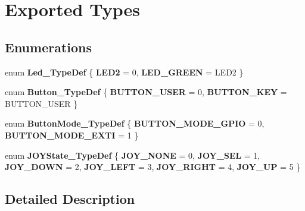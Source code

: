 \hypertarget{group___s_t_m32_f0_x_x___n_u_c_l_e_o___exported___types}{}\section{Exported Types}
\label{group___s_t_m32_f0_x_x___n_u_c_l_e_o___exported___types}
\subsection*{Enumerations}
\begin{DoxyCompactItemize}
\item 
\mbox{\label{group___s_t_m32_f0_x_x___n_u_c_l_e_o___exported___types_gaa059704b7ca945eb9c1e7f2c3d03fecd}} 
enum {\bfseries Led\+\_\+\+Type\+Def} \{ {\bfseries L\+E\+D2} = 0, 
{\bfseries L\+E\+D\+\_\+\+G\+R\+E\+EN} = L\+E\+D2
 \}
\item 
\mbox{\label{group___s_t_m32_f0_x_x___n_u_c_l_e_o___exported___types_ga643816dfbad5c734fc25a29ce8d35bb1}} 
enum {\bfseries Button\+\_\+\+Type\+Def} \{ {\bfseries B\+U\+T\+T\+O\+N\+\_\+\+U\+S\+ER} = 0, 
{\bfseries B\+U\+T\+T\+O\+N\+\_\+\+K\+EY} = B\+U\+T\+T\+O\+N\+\_\+\+U\+S\+ER
 \}
\item 
\mbox{\label{group___s_t_m32_f0_x_x___n_u_c_l_e_o___exported___types_ga48825b7c7d851c440ef8e808fd9d8f0a}} 
enum {\bfseries Button\+Mode\+\_\+\+Type\+Def} \{ {\bfseries B\+U\+T\+T\+O\+N\+\_\+\+M\+O\+D\+E\+\_\+\+G\+P\+IO} = 0, 
{\bfseries B\+U\+T\+T\+O\+N\+\_\+\+M\+O\+D\+E\+\_\+\+E\+X\+TI} = 1
 \}
\item 
\mbox{\label{group___s_t_m32_f0_x_x___n_u_c_l_e_o___exported___types_ga7466d9ae142b713772373c9ddfc90332}} 
enum {\bfseries J\+O\+Y\+State\+\_\+\+Type\+Def} \{ \newline
{\bfseries J\+O\+Y\+\_\+\+N\+O\+NE} = 0, 
{\bfseries J\+O\+Y\+\_\+\+S\+EL} = 1, 
{\bfseries J\+O\+Y\+\_\+\+D\+O\+WN} = 2, 
{\bfseries J\+O\+Y\+\_\+\+L\+E\+FT} = 3, 
\newline
{\bfseries J\+O\+Y\+\_\+\+R\+I\+G\+HT} = 4, 
{\bfseries J\+O\+Y\+\_\+\+UP} = 5
 \}
\end{DoxyCompactItemize}


\subsection{Detailed Description}
